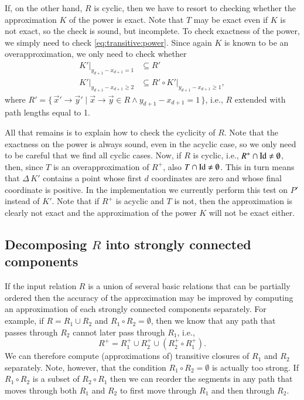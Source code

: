 If, on the other hand, $R$ is cyclic, then we have to resort
to checking whether the approximation $K$ of the power is exact.
Note that $T$ may be exact even if $K$ is not exact, so the check
is sound, but incomplete.
To check exactness of the power, we simply need to check
\eqref{eq:transitive:power}.  Since again $K$ is known
to be an overapproximation, we only need to check whether
$$
\begin{aligned}
K'|_{y_{d+1} - x_{d+1} = 1} & \subseteq R'
\\
K'|_{y_{d+1} - x_{d+1} \ge 2} & \subseteq R' \circ K'|_{y_{d+1} - x_{d+1} \ge 1}
,
\end{aligned}
$$
where $R' = \{\, \vec x' \to \vec y' \mid \vec x \to \vec y \in R
\wedge y_{d+1} - x_{d+1} = 1\,\}$, i.e., $R$ extended with path
lengths equal to 1.

All that remains is to explain how to check the cyclicity of $R$.
Note that the exactness on the power is always sound, even
in the acyclic case, so we only need to be careful that we find
all cyclic cases.  Now, if $R$ is cyclic, i.e.,
$R^+ \cap \mathop{\rm Id}\nolimits \ne \emptyset$, then, since $T$ is
an overapproximation of $R^+$, also
$T \cap \mathop{\rm Id}\nolimits \ne \emptyset$.  This in turn means
that $\Delta \, K'$ contains a point whose first $d$ coordinates
are zero and whose final coordinate is positive.
In the implementation we currently perform this test on $P'$ instead of $K'$.
Note that if $R^+$ is acyclic and $T$ is not, then the approximation
is clearly not exact and the approximation of the power $K$
will not be exact either.

\subsection{Decomposing $R$ into strongly connected components}

If the input relation $R$ is a union of several basic relations
that can be partially ordered
then the accuracy of the approximation may be improved by computing
an approximation of each strongly connected components separately.
For example, if $R = R_1 \cup R_2$ and $R_1 \circ R_2 = \emptyset$,
then we know that any path that passes through $R_2$ cannot later
pass through $R_1$, i.e.,
\begin{equation}
\label{eq:transitive:components}
R^+ = R_1^+ \cup R_2^+ \cup \left(R_2^+ \circ R_1^+\right)
.
\end{equation}
We can therefore compute (approximations of) transitive closures
of $R_1$ and $R_2$ separately.
Note, however, that the condition $R_1 \circ R_2 = \emptyset$
is actually too strong.
If $R_1 \circ R_2$ is a subset of $R_2 \circ R_1$
then we can reorder the segments
in any path that moves through both $R_1$ and $R_2$ to
first move through $R_1$ and then through $R_2$.

